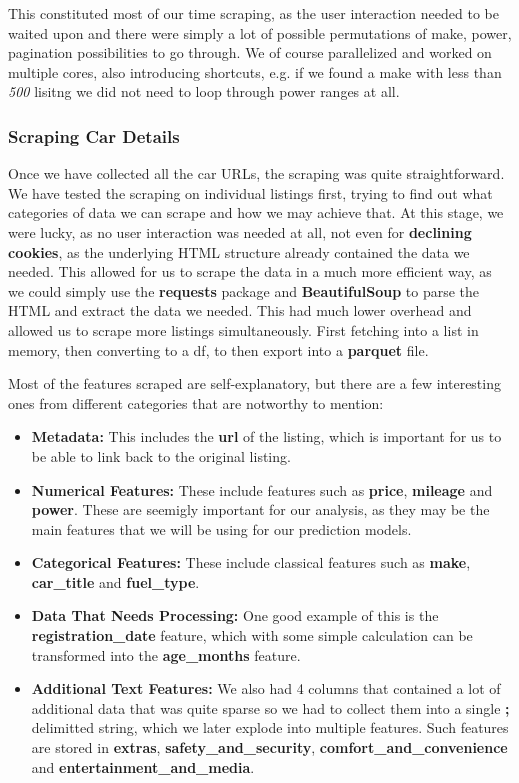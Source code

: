 \documentclass[12pt]{article}
\begin{document}
This constituted most of our time scraping, as the user interaction needed to be waited upon and there were simply a lot of possible permutations of make, power, pagination possibilities to go through.
We of course parallelized and worked on multiple cores, also introducing shortcuts, e.g. if we found a make with less than \textit{500} lisitng we did not need to loop through power ranges at all.

\subsubsection{Scraping Car Details}\label{sec:scraping_car_details}

Once we have collected all the car URLs, the scraping was quite straightforward. We have tested the scraping on individual listings first, trying to find out what categories of data we can scrape and how we may achieve that. At this stage, we were lucky, as no user interaction was needed at all, not even for \textbf{declining cookies}, as the underlying HTML structure already contained the data we needed.
This allowed for us to scrape the data in a much more efficient way, as we could simply use the \textbf{requests} package and \textbf{BeautifulSoup} to parse the HTML and extract the data we needed. This had much lower overhead and allowed us to scrape more listings simultaneously. First fetching into a list in memory, then converting to a df, to then export into a \textbf{parquet} file.

Most of the features scraped are self-explanatory, but there are a few interesting ones from different categories that are notworthy to mention:

\begin{itemize}
  \item \textbf{Metadata:} This includes the \textbf{url} of the listing, which is important for us to be able to link back to the original listing.
  \item \textbf{Numerical Features:} These include features such as \textbf{price}, \textbf{mileage} and \textbf{power}. These are seemigly important for our analysis, as they may be the main features that we will be using for our prediction models.
  \item \textbf{Categorical Features:} These include classical features such as \textbf{make}, \textbf{car\_title} and \textbf{fuel\_type}.
  \item \textbf{Data That Needs Processing:} One good example of this is the \textbf{registration\_date} feature, which with some simple calculation can be transformed into the \textbf{age\_months} feature.
  \item \textbf{Additional Text Features:} We also had 4 columns that contained a lot of additional data that was quite sparse so we had to collect them into a single \textbf{;} delimitted string, which we later explode into multiple features. Such features are stored in \textbf{extras}, \textbf{safety\_and\_security}, \textbf{comfort\_and\_convenience} and \textbf{entertainment\_and\_media}.
\end{itemize}
\end{document}
